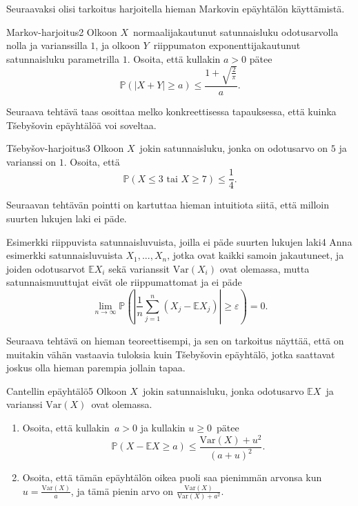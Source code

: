 \documentclass[11pt,a4paper]{amsart}
\newcommand{\E}{\mathbb{E}}
\newcommand{\1}{\mathbf{1}}
\renewcommand{\P}{\mathbb P}
\renewcommand{\epsilon}{\varepsilon}
\begin{document}
Seuraavaksi olisi tarkoitus harjoitella hieman Markovin epäyhtälön käyttämistä.

\begin{Exercises}{Markov-harjoitus}{2}
Olkoon $X$ normaalijakautunut satunnaisluku odotusarvolla nolla ja varianssilla $1$, ja olkoon $Y$ riippumaton exponenttijakautunut satunnaisluku parametrilla $1$. Osoita, että kullakin $a>0$ pätee 
\[
\P(|X+Y|\geq a)\leq \frac{1+\sqrt{\frac{2}{\pi}}}{a}.
\]

\end{Exercises}


Seuraava tehtävä taas osoittaa melko konkreettisessa tapauksessa, että kuinka T\v{s}eby\v{s}ovin epäyhtälöä voi soveltaa. 


\begin{Exercises}{T\v{s}eby\v{s}ov-harjoitus}{3}
Olkoon $X$ jokin satunnaisluku, jonka on odotusarvo on $5$ ja varianssi on $1$. Osoita, että 
\[
\P(X\leq 3 \text{ tai } X\geq 7)\leq \frac{1}{4}.
\]

\end{Exercises}


Seuraavan tehtävän pointti on kartuttaa hieman intuitiota siitä, että milloin suurten lukujen laki ei päde.

\begin{Exercises}{Esimerkki riippuvista satunnaisluvuista, joilla ei päde suurten lukujen laki}{4}
Anna esimerkki satunnaisluvuista $X_1,...,X_n$‚ jotka ovat kaikki samoin jakautuneet, ja joiden odotusarvot $\E X_i$ sekä varianssit $\mathrm{Var}(X_i)$ ovat olemassa, mutta satunnaismuuttujat eivät ole riippumattomat ja ei päde
\[
\lim_{n\to\infty}\P\left(\left|\frac{1}{n}\sum_{j=1}^n (X_j-\E X_j)\right|\geq \epsilon\right)=0.
\]  

\end{Exercises}

Seuraava tehtävä on hieman teoreettisempi, ja sen on tarkoitus näyttää, että on muitakin vähän vastaavia tuloksia kuin T\v{s}eby\v{s}ovin epäyhtälö, jotka saattavat joskus olla hieman parempia jollain tapaa. 

\begin{Exercises}{Cantellin epäyhtälö}{5}
Olkoon $X$ jokin satunnaisluku, jonka odotusarvo $\E X$ ja varianssi $\mathrm{Var}(X)$ ovat olemassa. \begin{enumerate}
\item Osoita, että kullakin $a>0$ ja kullakin $u\geq 0$ pätee
\[
\P(X-\E X\geq a)\leq \frac{\mathrm{Var}(X)+u^2}{(a+u)^2}.
\]

\item Osoita, että tämän epäyhtälön oikea puoli saa pienimmän arvonsa kun $u=\frac{\mathrm{Var}(X)}{a}$, ja tämä pienin arvo on $\frac{\mathrm{Var}(X)}{\mathrm{Var}(X)+a^2}$. 

\end{enumerate}
\end{Exercises}
\end{document}
